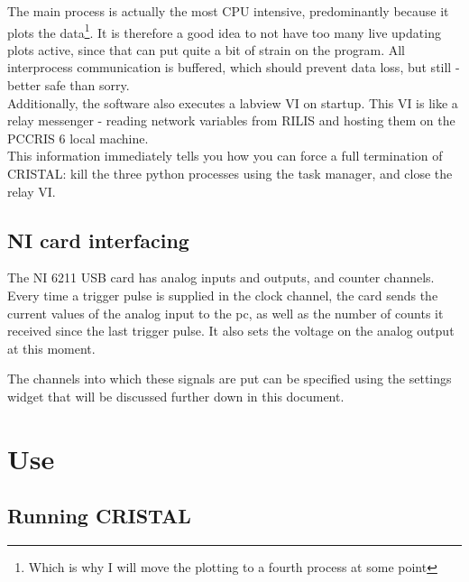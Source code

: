 \documentclass[10pt,a4paper]{article}
\begin{document}
The main process is actually the most CPU intensive, predominantly because it plots the data\footnote{Which is why I will move the plotting to a fourth process at some point}. It is therefore a good idea to not have too many live updating plots active, since that can put quite a bit of strain on the program. All interprocess communication is buffered, which should prevent data loss, but still - better safe than sorry.\\

Additionally, the software also executes a labview VI on startup. This VI is like a relay messenger - reading network variables from RILIS and hosting them on the PCCRIS 6 local machine. \\

This information immediately tells you how you can force a full termination of CRISTAL: kill the three python processes using the task manager, and close the relay VI.

\subsection{NI card interfacing}

The NI 6211 USB card has analog inputs and outputs, and counter channels. Every time a trigger pulse is supplied in the clock channel, the card sends the current values of the analog input to the pc, as well as the number of counts it received since the last trigger pulse. It also sets the voltage on the analog output at this moment.

The channels into which these signals are put can be specified using the settings widget that will be discussed further down in this document.

\section{Use}

\subsection{Running CRISTAL}
\end{document}
